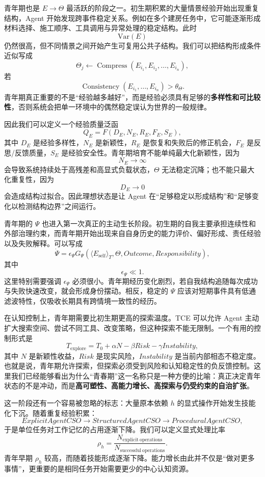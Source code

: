 青年期也是 $E\rightarrow\Theta$ 最活跃的阶段之一。初生期积累的大量情景经验开始出现重复结构，Agent 开始发现跨事件稳定关系。例如在多个建房任务中，它可能逐渐形成材料选择、施工顺序、工具调用与异常处理的稳定结构。此时
\[
\mathrm{Var}(E)
\]
仍然很高，但不同情景之间开始产生可复用公共子结构。我们可以把结构形成条件近似写成
\[
\Theta_j
\leftarrow
\operatorname{Compress}
\left(
E_{i_1},E_{i_2},\ldots,E_{i_n}
\right),
\]
若
\[
\operatorname{Consistency}
\left(
E_{i_1},\ldots,E_{i_n}
\right)
>
\theta_\Theta.
\]
青年期真正重要的不是“经验越多越好”，而是经验必须具有足够的\textbf{多样性和可比较性}，否则系统会把单一环境中的偶然稳定误认为世界的一般规律。

因此我们可以定义一个经验质量泛函
\[
Q_E
=
F
\left(
D_E,
N_E,
R_E,
F_E,
S_E
\right),
\]
其中 $D_E$ 是经验多样性，$N_E$ 是新颖性，$R_E$ 是恢复和失败后的修正机会，$F_E$ 是反思/反馈质量，$S_E$ 是经验安全性。青年期培育不能单纯最大化新颖性，因为
\[
N_E\rightarrow\infty
\]
会导致系统持续处于高残差和高显式负载状态，$\Theta$ 无法稳定沉降；也不能只最大化重复性，因为
\[
D_E\rightarrow 0
\]
会造成结构过拟合。因此理想状态是让 Agent 在“足够稳定以形成结构”和“足够变化以检测结构边界”之间运行。

青年期的 $\Psi$ 也进入第一次真正的主动生长阶段。初生期的自我主要承担连续性和外部治理约束，而青年期开始出现来自自身历史的能力评价、偏好形成、责任经验以及失败解释。可以写成
\[
\dot{\Psi}
=
\epsilon_\Psi
G_\Psi
\left(
\langle E_{\mathrm{self}}\rangle_T,
\Theta,
Outcome,
Responsibility
\right),
\]
其中
\[
\epsilon_\Psi\ll 1.
\]
这里特别需要强调 $\epsilon_\Psi$ 必须很小。青年期经历变化剧烈，若自我结构追随每次成功与失败快速改变，就会形成身份摆动。相反，稳定的 $\Psi$ 应该对短期事件具有低通滤波特性，仅吸收长期具有跨情境一致性的经历。

在认知控制上，青年期需要比初生期更高的探索温度。TCE 可以允许 Agent 主动扩大搜索空间、尝试不同工具、改变策略，但这种探索不能无限制。一个有用的控制形式是
\[
T_{\mathrm{explore}}
=
T_0
+
\alpha N
-
\beta Risk
-
\gamma Instability,
\]
其中 $N$ 是新颖性收益，$Risk$ 是现实风险，$Instability$ 是当前内部相态不稳定度。也就是说，青年期允许探索，但探索必须受到风险和认知稳定性的负反馈控制。这里我们已经能够看出为什么“青春期”这一名称只是一种方便的比喻：真正决定青年状态的不是冲动，而是\textbf{高可塑性、高能力增长、高探索与仍受约束的自治扩张}。

这一阶段还有一个容易被忽略的标志：大量原本依赖 $h$ 的显式操作开始发生技能化下沉。随着重复经验积累：
\[
ExplicitAgentCSO
\rightarrow
StructuredAgentCSO
\rightarrow
ProceduralAgentCSO,
\]
于是单位任务对工作记忆的占用逐渐下降。我们可以定义显式处理比率
\[
\rho_h
=
\frac{
N_{\mathrm{explicit\ operations}}
}{
N_{\mathrm{successful\ operations}}
}.
\]
青年早期 $\rho_h$ 较高，而随着技能形成逐渐下降。能力增长由此并不仅是“做对更多事情”，更重要的是相同任务开始需要更少的中心认知资源。

